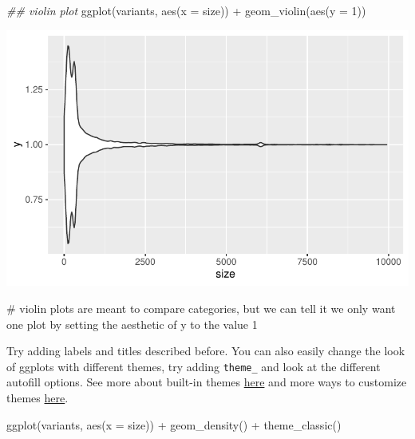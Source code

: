 \documentclass[
  letterpaper,
  DIV=11,
  numbers=noendperiod]{scrreprt}
\newenvironment{Shaded}{\begin{snugshade}}{\end{snugshade}}
\newcommand{\AttributeTok}[1]{\textcolor[rgb]{0.40,0.45,0.13}{#1}}
\newcommand{\CommentTok}[1]{\textcolor[rgb]{0.37,0.37,0.37}{#1}}
\newcommand{\DecValTok}[1]{\textcolor[rgb]{0.68,0.00,0.00}{#1}}
\newcommand{\DocumentationTok}[1]{\textcolor[rgb]{0.37,0.37,0.37}{\textit{#1}}}
\newcommand{\FunctionTok}[1]{\textcolor[rgb]{0.28,0.35,0.67}{#1}}
\newcommand{\NormalTok}[1]{\textcolor[rgb]{0.00,0.23,0.31}{#1}}
\newcommand{\SpecialCharTok}[1]{\textcolor[rgb]{0.37,0.37,0.37}{#1}}
\begin{document}
\begin{Shaded}
\begin{Highlighting}[]
\DocumentationTok{\#\# violin plot}
\FunctionTok{ggplot}\NormalTok{(variants, }\FunctionTok{aes}\NormalTok{(}\AttributeTok{x =}\NormalTok{ size)) }\SpecialCharTok{+}
  \FunctionTok{geom\_violin}\NormalTok{(}\FunctionTok{aes}\NormalTok{(}\AttributeTok{y =} \DecValTok{1}\NormalTok{)) }
\end{Highlighting}
\end{Shaded}

\includegraphics{scripts/02_dataViz/class3_files/figure-pdf/unnamed-chunk-14-4.pdf}

\begin{Shaded}
\begin{Highlighting}[]
\CommentTok{\# violin plots are meant to compare categories, but we can tell it we only want one plot by setting the aesthetic of \textasciigrave{}y\textasciigrave{} to the value 1}
\end{Highlighting}
\end{Shaded}

Try adding labels and titles described before. You can also easily
change the look of ggplots with different themes, try adding
\texttt{theme\_} and look at the different autofill options. See more
about built-in themes
\href{https://ggplot2.tidyverse.org/reference/ggtheme.html}{here} and
more ways to customize themes
\href{https://ggplot2.tidyverse.org/reference/ggtheme.html}{here}.

\begin{Shaded}
\begin{Highlighting}[]
\FunctionTok{ggplot}\NormalTok{(variants, }\FunctionTok{aes}\NormalTok{(}\AttributeTok{x =}\NormalTok{ size)) }\SpecialCharTok{+}
  \FunctionTok{geom\_density}\NormalTok{() }\SpecialCharTok{+}
  \FunctionTok{theme\_classic}\NormalTok{()}
\end{Highlighting}
\end{Shaded}
\end{document}
